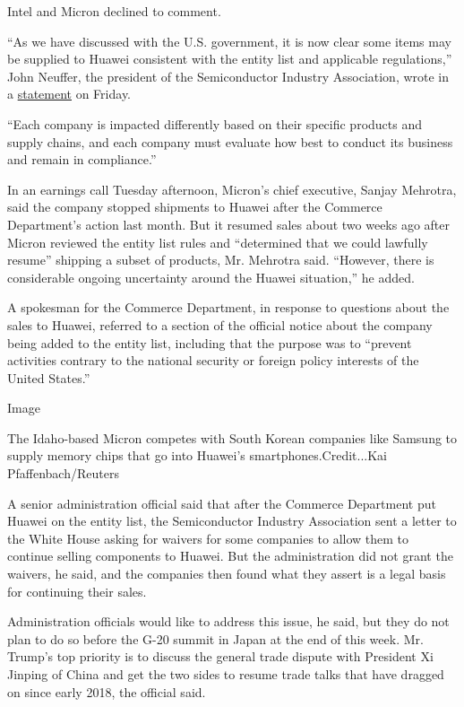 Intel and Micron declined to comment.

``As we have discussed with the U.S. government, it is now clear some
items may be supplied to Huawei consistent with the entity list and
applicable regulations,'' John Neuffer, the president of the
Semiconductor Industry Association, wrote in a
\href{https://www.semiconductors.org/sia-statement-on-the-scope-of-the-addition-of-huawei-to-the-commerce-departments-entity-list/}{statement}
on Friday.

``Each company is impacted differently based on their specific products
and supply chains, and each company must evaluate how best to conduct
its business and remain in compliance.''

In an earnings call Tuesday afternoon, Micron's chief executive, Sanjay
Mehrotra, said the company stopped shipments to Huawei after the
Commerce Department's action last month. But it resumed sales about two
weeks ago after Micron reviewed the entity list rules and ``determined
that we could lawfully resume'' shipping a subset of products, Mr.
Mehrotra said. ``However, there is considerable ongoing uncertainty
around the Huawei situation,'' he added.

A spokesman for the Commerce Department, in response to questions about
the sales to Huawei, referred to a section of the official notice about
the company being added to the entity list, including that the purpose
was to ``prevent activities contrary to the national security or foreign
policy interests of the United States.''

Image

The Idaho-based Micron competes with South Korean companies like Samsung
to supply memory chips that go into Huawei's smartphones.Credit...Kai
Pfaffenbach/Reuters

A senior administration official said that after the Commerce Department
put Huawei on the entity list, the Semiconductor Industry Association
sent a letter to the White House asking for waivers for some companies
to allow them to continue selling components to Huawei. But the
administration did not grant the waivers, he said, and the companies
then found what they assert is a legal basis for continuing their sales.

Administration officials would like to address this issue, he said, but
they do not plan to do so before the G-20 summit in Japan at the end of
this week. Mr. Trump's top priority is to discuss the general trade
dispute with President Xi Jinping of China and get the two sides to
resume trade talks that have dragged on since early 2018, the official
said.

